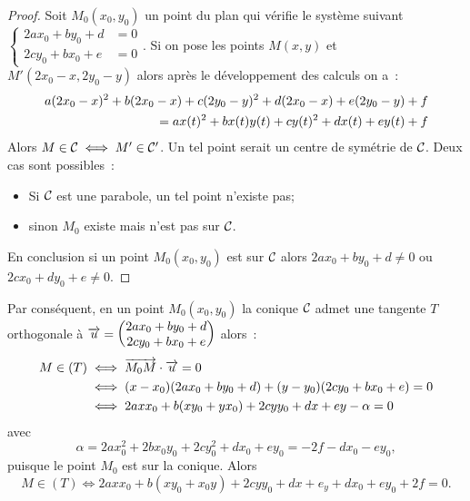 \begin{proof}
  Soit \(M_0(x_0, y_0)\) un point du plan qui vérifie le système suivant
  \(\begin{cases}2ax_0 + by_0 + d & = 0 \\ 2cy_0 + bx_0 + e & = 0\end{cases}\). Si
  on pose les points \(M(x, y)\) et \(M'(2x_0-x, 2y_0-y)\) alors après le
  développement des calculs on a~:
  \begin{align}
    a(2x_0-x)^2 + b(2x_0-x) + c(2y_0-y)^2 + d(2x_0-x) + e(2y_0-y) + f \notag \\
    = ax(t)^2 + bx(t)y(t) + cy(t)^2 + dx(t) + ey(t) + f
  \end{align}
  Alors \(M \in \mathcal{C}_{{}} \iff M' \in \mathcal{C}_{{}}'\). Un tel point serait un
  centre de symétrie de \(\mathcal{C}_{{}}\). Deux cas sont possibles~:
  \begin{itemize}
    \item Si \(\mathcal{C}_{{}}\) est une parabole, un tel point n'existe pas;
    \item sinon \(M_0\) existe mais n'est pas sur \(\mathcal{C}_{{}}\).
  \end{itemize}
  En conclusion si un point \(M_0(x_0, y_0)\) est sur \(\mathcal{C}_{{}}\) alors
  \(2ax_0 + by_0 + d \neq 0\) ou \(2cx_0 + dy_0 + e \neq 0\).
\end{proof}

Par conséquent, en un point \(M_0(x_0, y_0)\) la conique \(\mathcal{C}_{{}}\)
admet une tangente \(T\) orthogonale à \(\overrightarrow{u} = \begin{pmatrix} 2ax_0
+by_0 +d \\ 2cy_0 + bx_0 + e \end{pmatrix}\)  alors~:
\begin{align}
  M \in (T) &\iff \overrightarrow{M_0 M} \cdot \overrightarrow{u} = 0 \\
            &\iff (x-x_0)(2ax_0 + by_0 + d) + (y-y_0)(2cy_0 + bx_0 + e) = 0 \\
            &\iff 2axx_0 + b(xy_0 + yx_0) + 2cyy_0 +dx + ey - \alpha = 0
\end{align}
avec
\begin{equation}
  \alpha = 2ax_0^2+  2bx_0y_0 + 2cy_0^2 + dx_0 + ey_0 = -2f-dx_0-ey_0,
\end{equation}
puisque le point \(M_0\) est sur la conique. Alors
\begin{equation}
  M \in (T) \iff 2axx_0 + b(xy_0 + x_0y) + 2cyy_0 + dx + e_y + dx_0 + ey_0 + 2f = 0.
\end{equation}


